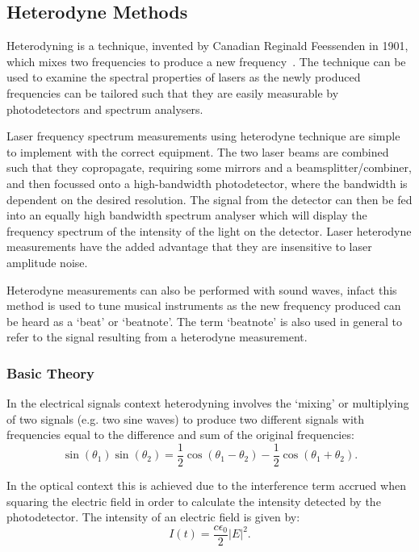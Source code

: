 \subsection{Heterodyne Methods}

Heterodyning is a technique, invented by Canadian Reginald Feessenden in 1901, which mixes two frequencies to produce a new frequency~\cite{cooper_physics_2001}.
The technique can be used to examine the spectral properties of lasers as the newly produced frequencies can be tailored such that they are easily measurable by photodetectors and spectrum analysers.

Laser frequency spectrum measurements using heterodyne technique are simple to implement with the correct equipment.
The two laser beams are combined such that they copropagate, requiring some mirrors and a beamsplitter/combiner, and then focussed onto a high-bandwidth photodetector, where the bandwidth is dependent on the desired resolution.
The signal from the detector can then be fed into an equally high bandwidth spectrum analyser which will display the frequency spectrum of the intensity of the light on the detector.
Laser heterodyne measurements have the added advantage that they are insensitive to laser amplitude noise.

Heterodyne measurements can also be performed with sound waves, infact this method is used to tune musical instruments as the new frequency produced can be heard as a `beat' or `beatnote'.
The term `beatnote' is also used in general to refer to the signal resulting from a heterodyne measurement.

\subsubsection{Basic Theory}
In the electrical signals context heterodyning involves the `mixing' or multiplying of two signals (e.g. two sine waves) to produce two different signals with frequencies equal to the difference and sum of the original frequencies:
\begin{equation}
\sin(\theta_1)\sin(\theta_2) = \frac{1}{2} \cos(\theta_1-\theta_2) - \frac{1}{2} \cos(\theta_1+\theta_2).
\end{equation}

In the optical context this is achieved due to the interference term accrued when squaring the electric field in order to calculate the intensity detected by the photodetector. The intensity of an electric field is given by:
\begin{equation}
I(t) = \frac{c\epsilon_0}{2}|E|^2.
\end{equation}

